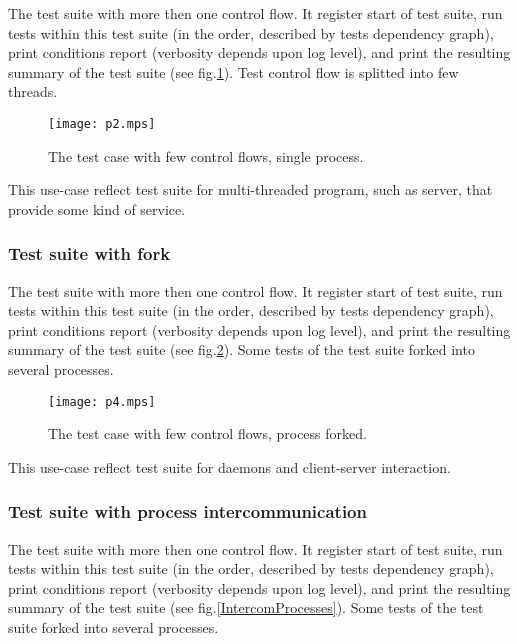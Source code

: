 \documentclass[a4paper,twoside]{article}
\begin{document}
The test suite with more then one control flow. It register start of test suite,
run tests within this test suite (in the order, described by tests dependency
graph), print conditions report (verbosity depends upon log level), and print the resulting summary of the test suite (see fig.\ref{ThreadedFlow}).
Test control flow is splitted into few threads.

\begin{figure}
  \begin{center}
  \texttt{[image: p2.mps]}
  \end{center}
  \caption{The test case with few control flows, single process.\label{ThreadedFlow}}
\end{figure}

This use-case reflect test suite for multi-threaded program, such as server,
that provide some kind of service.

\subsubsection{Test suite with fork}

The test suite with more then one control flow. It register start of test suite,
run tests within this test suite (in the order, described by tests dependency
graph), print conditions report (verbosity depends upon log level), and print the resulting summary of the test suite (see fig.\ref{ForkedFlow}).
Some tests of the test suite forked into several processes.

\begin{figure}
  \begin{center}
  \texttt{[image: p4.mps]}
  \end{center}
  \caption{The test case with few control flows, process forked.\label{ForkedFlow}}
\end{figure}

This use-case reflect test suite for daemons and client-server interaction.

\subsubsection{Test suite with process intercommunication}

The test suite with more then one control flow. It register start of test suite,
run tests within this test suite (in the order, described by tests dependency
graph), print conditions report (verbosity depends upon log level), and print the resulting summary of the test suite (see fig.\ref{IntercomProcesses}).
Some tests of the test suite forked into several processes.
\end{document}
